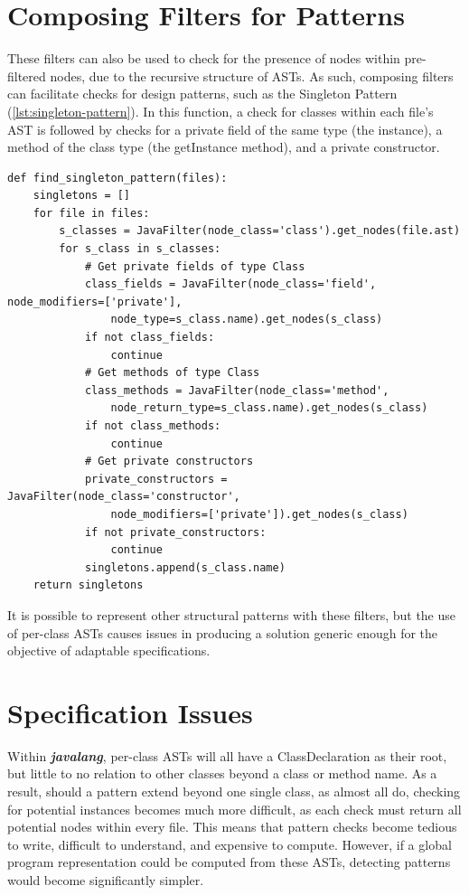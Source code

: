 \section{Composing Filters for Patterns}
These filters can also be used to check for the presence of nodes within pre-filtered nodes, due to the recursive structure of ASTs. As such, composing filters can facilitate checks for design patterns, such as the Singleton Pattern (\cref{lst:singleton-pattern}). In this function, a check for classes within each file's AST is followed by checks for a private field of the same type (the instance), a method of the class type (the getInstance method), and a private constructor.
\begin{listing}[H]
\begin{verbatim}
def find_singleton_pattern(files):
    singletons = []
    for file in files:
        s_classes = JavaFilter(node_class='class').get_nodes(file.ast)
        for s_class in s_classes:
            # Get private fields of type Class
            class_fields = JavaFilter(node_class='field', node_modifiers=['private'],
                node_type=s_class.name).get_nodes(s_class)
            if not class_fields:
                continue
            # Get methods of type Class
            class_methods = JavaFilter(node_class='method',
                node_return_type=s_class.name).get_nodes(s_class)
            if not class_methods:
                continue
            # Get private constructors
            private_constructors = JavaFilter(node_class='constructor',
                node_modifiers=['private']).get_nodes(s_class)
            if not private_constructors:
                continue
            singletons.append(s_class.name)
    return singletons
\end{verbatim}
\caption{A Python function to return all potential implementations of a Singleton pattern within a Java project}
\label{lst:singletonFilter}
\end{listing}

It is possible to represent other structural patterns with these filters, but the use of per-class ASTs causes issues in producing a solution generic enough for the objective of adaptable specifications.

\section{Specification Issues}
Within \textbf{\emph{javalang}}, per-class ASTs will all have a ClassDeclaration as their root, but little to no relation to other classes beyond a class or method name. As a result, should a pattern extend beyond one single class, as almost all do, checking for potential instances becomes much more difficult, as each check must return all potential nodes within every file. This means that pattern checks become tedious to write, difficult to understand, and expensive to compute. However, if a global program representation could be computed from these ASTs, detecting patterns would become significantly simpler.